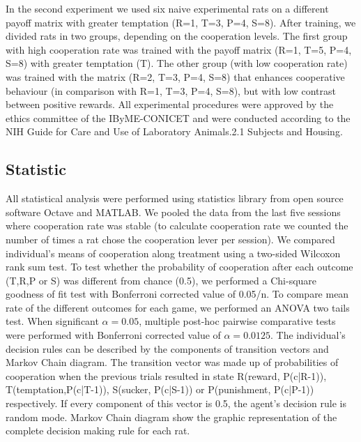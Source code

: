 \documentclass[10pt,letterpaper]{article}
\begin{document}
In the second experiment we used six naive experimental rats on a different payoff matrix with greater temptation (R=1, T=3, P=4, S=8). After training, we divided rats in two groups, depending on the cooperation levels. The first group with high cooperation rate was trained with the payoff matrix (R=1, T=5, P=4, S=8) with greater temptation (T). The other group (with low cooperation rate) was trained with the matrix (R=2, T=3, P=4, S=8) that enhances cooperative behaviour (in comparison with R=1, T=3, P=4, S=8), but with low contrast between positive rewards.
All experimental procedures were approved by the ethics committee of the IByME-CONICET and were conducted according to the NIH Guide for Care and Use of Laboratory Animals.2.1 Subjects and Housing.               

\subsection*{Statistic} 
All statistical analysis were performed using statistics library from open source software Octave and MATLAB. We pooled the data from the last five sessions where cooperation rate was stable (to calculate cooperation rate we counted the number of times a rat chose the cooperation lever per session).
We compared individual’s means of cooperation along treatment using a two-sided Wilcoxon rank sum test.
To test whether the probability of cooperation after each outcome (T,R,P or S) was different from chance (0.5), we performed a Chi-square goodness of fit test with Bonferroni corrected value of 0.05/n.
To compare mean rate of the different outcomes for each game, we performed an ANOVA two tails test. When significant $\alpha=0.05$, multiple post-hoc pairwise comparative tests were performed with Bonferroni corrected value of $\alpha=0.0125$.
The individual's decision rules can be described by the components of transition vectors and Markov Chain diagram. The transition vector was made up of probabilities of cooperation when the previous trials resulted in state R(reward, P(c|R-1)), T(temptation,P(c|T-1)), S(sucker, P(c|S-1)) or P(punishment, P(c|P-1)) respectively. If every component of this vector is 0.5, the agent's decision rule is random mode. Markov Chain diagram show the graphic representation of the complete decision making rule for each rat.


\end{document}
